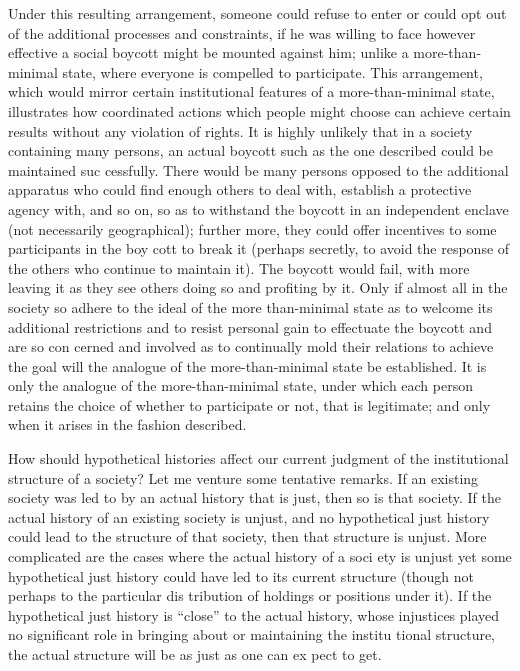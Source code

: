 \documentclass[11pt,openany]{book}
\begin{document}
Under this resulting arrangement, someone could refuse to enter or could opt out of the additional processes and constraints, if he was willing to face however effective a social boycott might be mounted against him; unlike a more-than-minimal state, where everyone is compelled to participate. This arrangement, which would mirror certain institutional features of a more-than-minimal state, illustrates how coordinated actions which people might choose can achieve certain results without any violation of rights. It is highly unlikely that in a society containing many persons, an actual boycott such as the one described could be maintained suc cessfully. There would be many persons opposed to the additional apparatus who could find enough others to deal with, establish a protective agency with, and so on, so as to withstand the boycott in an independent enclave (not necessarily geographical); further more, they could offer incentives to some participants in the boy cott to break it (perhaps secretly, to avoid the response of the others who continue to maintain it). The boycott would fail, with more leaving it as they see others doing so and profiting by it. Only if almost all in the society so adhere to the ideal of the more than-minimal state as to welcome its additional restrictions and to resist personal gain to effectuate the boycott and are so con cerned and involved as to continually mold their relations to achieve the goal will the analogue of the more-than-minimal state be established. It is only the analogue of the more-than-minimal state, under which each person retains the choice of whether to participate or not, that is legitimate; and only when it arises in the fashion described. 

How should hypothetical histories affect our current judgment of the institutional structure of a society? Let me venture some tentative remarks. If an existing society was led to by an actual history that is just, then so is that society. If the actual history of an existing society is unjust, and no hypothetical just history could lead to the structure of that society, then that structure is unjust. More complicated are the cases where the actual history of a soci ety is unjust yet some hypothetical just history could have led to its current structure (though not perhaps to the particular dis tribution of holdings or positions under it). If the hypothetical just history is ``close'' to the actual history, whose injustices played no significant role in bringing about or maintaining the institu tional structure, the actual structure will be as just as one can ex pect to get. 
\end{document}
